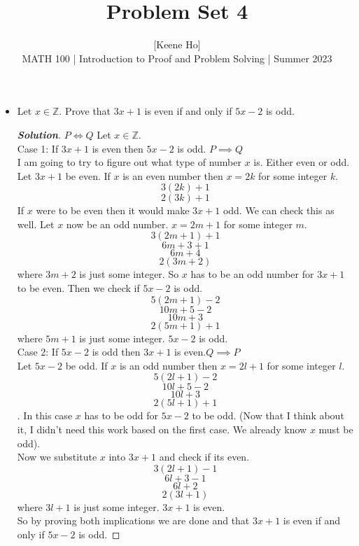 \documentclass[11pt]{article}
\newenvironment{problem}[2][Problem\!]{\begin{trivlist}
\item[\hskip \labelsep {\bfseries #1}\hskip \labelsep {\bfseries #2.}]}{\end{trivlist}}
\newenvironment{solution}{\begin{proof}[\textbf{\textit{Solution}}]}{\end{proof}}
\newcommand{\zz}{\mathbb Z}   %
\begin{document}
 
\title{Problem Set 4}
\author{[Keene Ho]\\[0.5em]
MATH 100 | Introduction to Proof and Problem Solving | Summer 2023}
\date{} 
\maketitle


\begin{problem}{4.1}\hfill
\begin{itemize}[itemsep=3em]
\item[(a)] Let $x \in \zz$. Prove that $3x + 1$ is even if and only if $5x - 2$ is odd.
\begin{solution}
\(P \iff Q\)
Let \(x \in \zz\).\\
Case 1: If \(3x+1\) is even then \(5x-2\) is odd. \(P \implies Q\)\\
I am going to try to figure out what type of number \(x\) is. Either even or odd.
Let \(3x+1\) be even. If \(x\) is an even number then \(x = 2k\) for some integer \(k\). 
\[3(2k)+1\]
\[2(3k)+1\]
If \(x\) were to be even then it would make \(3x+1\) odd. We can check this as well. Let \(x\) now be an odd number. \(x = 2m + 1\) for some integer \(m\).
\[3(2m+1)+1\]
\[6m+3+1\]
\[6m+4\]
\[2(3m+2)\] where \(3m+2\) is just some integer. So \(x\) has to be an odd number for \(3x+1\) to be even. Then we check if \(5x-2\) is odd.
\[5(2m+1)-2\]
\[10m+5-2\]
\[10m+3\]
\[2(5m+1)+1\] where \(5m+1\) is just some integer. \(5x-2\) is odd. \\
Case 2: If \(5x-2\) is odd then \(3x+1\) is even.\(Q \implies P\)\\
Let \(5x-2\) be odd. If \(x\) is an odd number then \(x = 2l + 1\) for some integer \(l\).
\[5(2l+1)-2\]
\[10l+5-2\]
\[10l+3\]
\[2(5l+1)+1\]. In this case \(x\) has to be odd for \(5x-2\) to be odd. (Now that I think about it, I didn't need this work based on the first case. We already know \(x\) must be odd).\\
Now we substitute \(x\) into \(3x+1\) and check if its even.
\[3(2l+1)-1\]
\[6l+3-1\]
\[6l+2\]
\[2(3l+1)\] where \(3l+1\) is just some integer. \(3x+1\) is even.\\
So by proving both implications we are done and that \(3x+1\) is even if and only if \(5x-2\) is odd.
\end{solution}


\end{itemize}
\end{problem}
\end{document}
